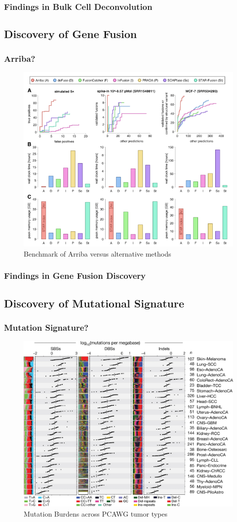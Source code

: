 \documentclass{beamer}
\begin{document}
    \begin{frame}
        \frametitle{Findings in Bulk Cell Deconvolution}
    \end{frame}

    \subsection{Discovery of Gene Fusion}
    \begin{frame}
        \frametitle{Arriba?}

        \begin{figure}
            \includegraphics[width=0.6 \linewidth]{figures/Workflow/Arriba.png}
            \caption{Benchmark of Arriba versus alternative methods \protect\cite{Arriba1}}
        \end{figure}
    \end{frame}

    \begin{frame}
        \frametitle{Findings in Gene Fusion Discovery}
    \end{frame}

    \subsection{Discovery of Mutational Signature}
    \begin{frame}
        \frametitle{Mutation Signature?}

        \begin{figure}
            \includegraphics[width=0.6 \linewidth]{figures/LungCancer/signatures.jpg}
            \caption{Mutation Burdens across PCAWG tumor types \protect\cite{signature1}}
        \end{figure}
    \end{frame}
\end{document}
